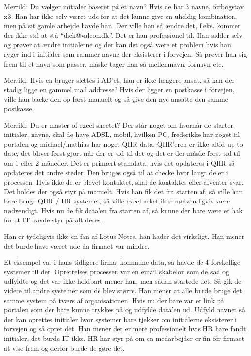 \begin{linenumbers*}
Merrild: Du vælger initialer baseret på et navn?
Hvis de har 3 navne, forbogstav x3. Han har ikke selv været ude for at det kunne give en uheldig kombination, men på sit gamle arbejde havde han.  Der ville han så ændre det, f.eks. kommer der ikke stil at stå “dick@valcon.dk”. Det er han professionel til. Han sidder selv og prøver at ændre initialerne og der kan det også være et problem hvis han ryger ind i initialer som rammer navne der eksisterer i forvejen. Så prøver han sig frem til et navn som passer, måske tager han så mellemnavn, fornavn etc. 

Merrild: Hvis en bruger slettes i AD’et, han er ikke længere ansat, så kan der stadig ligge en gammel mail addresse? 
Hvis der ligger en postkasse i forvejen, ville han backe den op først manuelt og så give den nye ansatte den samme postkasse.

Merrild: Du er master of excel sheetet?
Der står noget om hvornår de starter, initialer, navne, skal de have ADSL, mobil, hvilken PC, frederikke har noget til portalen og michael/mathias har noget QHR data.  QHR’eren er ikke altid up to date, det bliver først gjort når der er tid til det og det er der måske først tid til om 1 eller 2 måneder. Det er primært stamdata, hvis det opdateres i QHR så opdateres det andre steder. 
Den bruges også til at checke hvor langt de er i processen. Hvis ikke de er blevet kontaktet, skal de kontaktes eller afventer svar. Det holdes der også styr på manuelt. Hvis han fik det fra starten af, så ville han bare bruge QHR / HR systemet, så ville excel arket ikke nødvendigvis være nødvendigt. Hvis nu de fik data’en fra starten af, så kunne der bare være et hak for at IT havde styr på alt deres.

Han er tydeligvis ikke en fan af Lotus Notes, han hader det virkeligt. Han mener det burde have været ude da firmaet var mindre. 

Et eksempel var i hans tidligere firma, kommune data, så havde de 4 forskellige systemer til det. Oprettelses processen var en email skabelon som de sad og udfyldte og det var ikke holdbart mener han, men sådan startede det. Så gik de videre til andre systemer som de blev større. Han mener at alle burde bruge det samme system på tværs af organisationen. Hvis nu der bare var et link på portalen som der bare kunne trykkes på og udfylde data’en ud. Udfyld navnet så der kan oprettes initialer hvor systemer bare tjekker om initialerne eksisterer i forvejen og så opret det. Han mener det er mere professionelt hvis HR bare fandt initialer, det burde IT ikke. HR har styr på om en medarbejder er fin for firmaet at vise frem og derfor burde de gøre det.


\end{linenumbers*}
